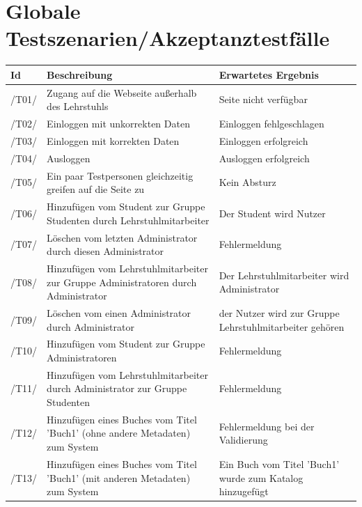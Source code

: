 \documentclass[12pt, a4paper]{article}
\begin{document}
\section{Globale Testszenarien/Akzeptanztestfälle}
\begin{table}[h]
	\begin{tabular}{p{1.2cm}|p{6.5cm}|p{5.5cm}}
		\textbf{Id} & \textbf{Beschreibung} & \textbf{Erwartetes Ergebnis}\\
		\hline
		/T01/ & Zugang auf die Webseite außerhalb des Lehrstuhls & Seite nicht verfügbar\\
		\hline
		/T02/ & Einloggen mit unkorrekten Daten & Einloggen fehlgeschlagen\\
		\hline
		/T03/ & Einloggen mit korrekten Daten & Einloggen erfolgreich\\
		\hline
		/T04/ & Ausloggen & Ausloggen erfolgreich\\
		\hline
		/T05/ & Ein paar Testpersonen gleichzeitig greifen auf die Seite zu & Kein Absturz\\
		\hline
		/T06/ & Hinzufügen vom Student zur Gruppe Studenten durch Lehrstuhlmitarbeiter & Der Student wird Nutzer\\
		\hline
		/T07/ & Löschen vom letzten Administrator durch diesen Administrator & Fehlermeldung\\
		\hline
		/T08/ & Hinzufügen vom Lehrstuhlmitarbeiter zur Gruppe Administratoren durch Administrator & Der Lehrstuhlmitarbeiter wird Administrator\\
		\hline
		/T09/ & Löschen vom einen Administrator durch Administrator & der Nutzer wird zur Gruppe Lehrstuhlmitarbeiter gehören\\
		\hline
		/T10/ & Hinzufügen vom Student zur Gruppe Administratoren & Fehlermeldung\\
		/T11/ & Hinzufügen vom Lehrstuhlmitarbeiter durch Administrator zur Gruppe Studenten & Fehlermeldung\\
		\hline
		/T12/ & Hinzufügen eines Buches vom Titel  'Buch1'  (ohne andere Metadaten) zum System & Fehlermeldung bei der Validierung\\
		\hline
		/T13/ & Hinzufügen eines Buches vom Titel  'Buch1'  (mit anderen Metadaten) zum System & Ein Buch vom Titel  'Buch1'  wurde zum Katalog hinzugefügt\\
    \end{tabular}
\end{table}
\end{document}
